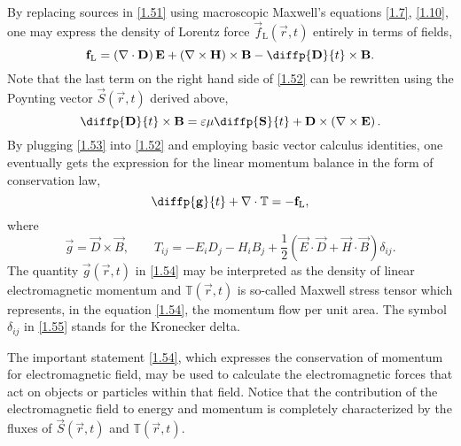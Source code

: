 By replacing sources in \ref{1.51} using macroscopic Maxwell's equations \ref{1.7}, \ref{1.10}, one may express the density of Lorentz force $ \vec{f}_\mathrm{L} \left( \vec{r}, t \right) $ entirely in terms of fields,
\begin{equation}
\label{1.52}
\vec{f}_\mathrm{L} = \left(\div{\vec{D}} \right) \vec{E} + \left(\rot{\vec{H}} \right) \times \vec{B} - \diffp{\vec{D}}{t} \times \vec{B}.
\end{equation}
Note that the last term on the right hand side of \ref{1.52} can be rewritten using the Poynting vector $ \vec{S}\left( \vec{r}, t \right) $ derived above, 
\begin{equation}
\label{1.53}
\diffp{\vec{D}}{t} \times \vec{B} = \varepsilon \mu \diffp{\vec{S}}{t} + \vec{D} \times \left(\rot{\vec{E}} \right).
\end{equation}
By plugging \ref{1.53} into \ref{1.52} and employing basic vector calculus identities, one eventually gets the expression for the linear momentum balance in the form of conservation law,
\begin{equation}
\label{1.54}
\diffp{\vec{g}}{t} + \div{\mathbb{T}} = -\vec{f}_\mathrm{L},
\end{equation}
where
\begin{equation}
\label{1.55}
\vec{g} = \vec{D} \times \vec{B}, \qquad T_{ij} = - E_i D_j - H_i B_j + \frac{1}{2} \left(\vec{E} \cdot \vec{D} + \vec{H} \cdot \vec{B} \right) \delta_{ij}.
\end{equation}
The quantity $ \vec{g}\left( \vec{r}, t \right) $ in \ref{1.54} may be interpreted as the density of linear electromagnetic momentum and $ \mathbb{T}\left( \vec{r}, t \right) $ is so-called Maxwell stress tensor which represents, in the equation \ref{1.54}, the momentum flow per unit area. The symbol $ \delta_{ij} $ in \ref{1.55} stands for the Kronecker delta.

The important statement \ref{1.54}, which expresses the conservation of momentum for electromagnetic field, may be used to calculate the electromagnetic forces that act on objects or particles within that field. Notice that the contribution of the electromagnetic field to energy and momentum is completely characterized by the fluxes of $ \vec{S}\left( \vec{r}, t \right) $ and $ \mathbb{T}\left( \vec{r}, t \right) $.



